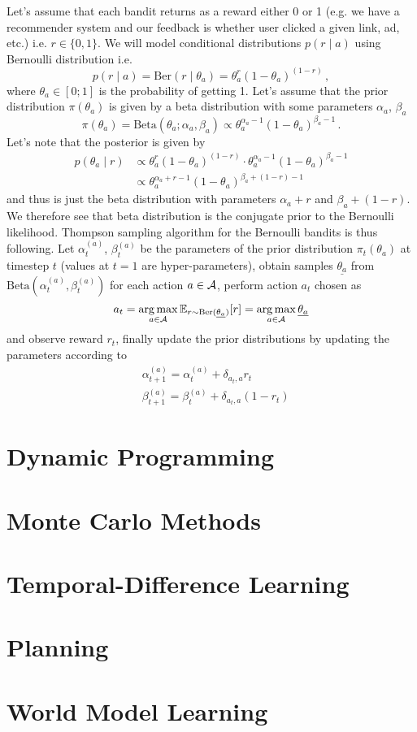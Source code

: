 \documentclass{myclass}
\begin{document}
Let's assume that each bandit returns as a reward either 0 or 1 (e.g. we have a recommender system
and our feedback is whether user clicked a given link, ad, etc.) i.e. $r \in \{0,1\}$. We will model
conditional distributions $p(r \mid a)$ using Bernoulli distribution i.e.
\[
    p(r \mid a) = \text{Ber}(r \mid \theta_a) = \theta_a^r (1 - \theta_a)^{(1-r)}\,,
\]
where $\theta_a \in [0;1]$ is the probability of getting 1. Let's assume that the prior distribution
$\pi(\theta_a)$ is given by a beta distribution with some parameters $\alpha_a$, $\beta_a$
\[
    \pi(\theta_a) = \text{Beta}(\theta_a; \alpha_a, \beta_a) \propto \theta_a^{\alpha_a - 1} (1 - \theta_a)^{\beta_a - 1}\,.
\]
Let's note that the posterior is given by
\[
\begin{split}
    p(\theta_a \mid r) &\propto \theta_a^r (1 - \theta_a)^{(1-r)} \cdot \theta_a^{\alpha_a - 1} (1 - \theta_a)^{\beta_a - 1} \\
                       &\propto \theta_a^{\alpha_a + r - 1} (1 - \theta_a)^{\beta_a + (1 - r) -1}
\end{split}
\]
and thus is just the beta distribution with parameters $\alpha_a + r$ and $\beta_a + (1-r)$. We
therefore see that beta distribution is the conjugate prior to the Bernoulli likelihood. Thompson
sampling algorithm for the Bernoulli bandits is thus following. Let $\alpha_t^{(a)}$,
$\beta_t^{(a)}$ be the parameters of the prior distribution $\pi_t(\theta_a)$ at timestep $t$
(values at $t=1$ are hyper-parameters), obtain samples $\underline{\theta_a}$ from
$\text{Beta}(\alpha_t^{(a)}, \beta_t^{(a)})$ for each action $a \in \mathcal{A}$, perform action $a_t$
chosen as
\[
    a_t = \operatorname*{arg\,max}_{a \in \mathcal{A}} \mathbb{E}_{r \sim \text{Ber}(\underline{\theta_a})}[r] = \operatorname*{arg\,max}_{a \in \mathcal{A}} \underline{\theta_a}
\]
and observe reward $r_t$, finally update the prior distributions by updating the parameters
according to
\[
\begin{split}
    &\alpha_{t+1}^{(a)} = \alpha_{t}^{(a)} + \delta_{a_t,a} r_t\\
    &\beta_{t+1}^{(a)} = \beta_{t}^{(a)} + \delta_{a_t,a} (1 - r_t)
\end{split}
\]

\section{Dynamic Programming}

\section{Monte Carlo Methods}

\section{Temporal-Difference Learning}

\section{Planning}

\section{World Model Learning}
\end{document}
